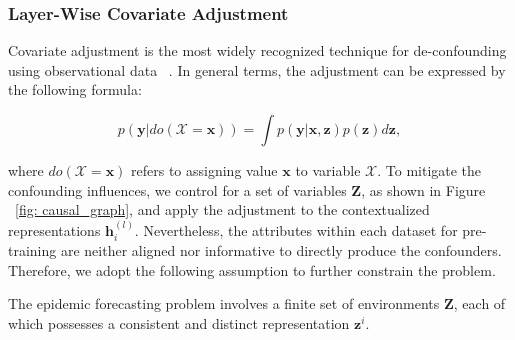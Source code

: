

\subsubsection{Layer-Wise Covariate Adjustment}
\label{sec: CA}


Covariate adjustment is the most widely recognized technique for de-confounding using observational data ~\cite{runge2023causal}. In general terms, the adjustment can be expressed by the following formula:

\begin{equation}
p(\mathbf{y} | do(\mathcal{X}=\mathbf{x})) = \int p(\mathbf{y} | \mathbf{x}, \mathbf{z}) p(\mathbf{z}) d\mathbf{z}, \tag{4}
\end{equation}

where $do(\mathcal{X}=\mathbf{x})$ refers to assigning value $\mathbf{x}$ to variable $\mathcal{X}$.
To mitigate the confounding influences, we control for a set of variables $\mathbf{Z}$, as shown in Figure ~\ref{fig: causal_graph}, and apply the adjustment to the contextualized representations $\mathbf{h}_i^{(l)}$. Nevertheless, the attributes within each dataset for pre-training are neither aligned nor informative to directly produce the confounders. Therefore, we adopt the following assumption to further constrain the problem.





\begin{assumption}
\label{assumption1}
The epidemic forecasting problem involves a finite set of environments $\mathbf{Z}$, each of which possesses a consistent and distinct representation $\mathbf{z}^i$.
\end{assumption}

